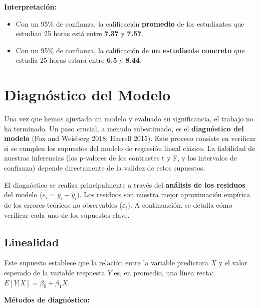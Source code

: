 \documentclass[
  letterpaper,
  DIV=11,
  numbers=noendperiod]{scrreprt}
\providecommand{\tightlist}{%
  \setlength{\itemsep}{0pt}\setlength{\parskip}{0pt}}
\begin{document}
\begin{tcolorbox}
\textbf{Interpretación:}

\begin{itemize}
\tightlist
\item
  Con un 95\% de confianza, la calificación \textbf{promedio} de los
  estudiantes que estudian 25 horas está entre \textbf{7.37} y
  \textbf{7.57}.
\item
  Con un 95\% de confianza, la calificación de \textbf{un estudiante
  concreto} que estudia 25 horas estará entre \textbf{6.5} y
  \textbf{8.44}.
\end{itemize}

\end{tcolorbox}

\section{Diagnóstico del Modelo}\label{diagnuxf3stico-del-modelo}

Una vez que hemos ajustado un modelo y evaluado su significancia, el
trabajo no ha terminado. Un paso crucial, a menudo subestimado, es el
\textbf{diagnóstico del modelo} (Fox and Weisberg 2018; Harrell 2015).
Este proceso consiste en verificar si se cumplen los supuestos del
modelo de regresión lineal clásico. La fiabilidad de nuestras
inferencias (los p-valores de los contrastes t y F, y los intervalos de
confianza) depende directamente de la validez de estos supuestos.

El diagnóstico se realiza principalmente a través del \textbf{análisis
de los residuos} del modelo (\(e_i = y_i - \hat{y}_i\)). Los residuos
son nuestra mejor aproximación empírica de los errores teóricos no
observables (\(\varepsilon_i\)). A continuación, se detalla cómo
verificar cada uno de los supuestos clave.

\subsection{Linealidad}\label{linealidad}

Este supuesto establece que la relación entre la variable predictora
\(X\) y el valor esperado de la variable respuesta \(Y\) es, en
promedio, una línea recta: \(E[Y | X] = \beta_0 + \beta_1 X\).

\textbf{Métodos de diagnóstico:}
\end{document}
